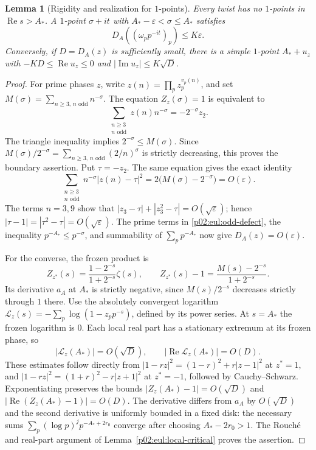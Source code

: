 \documentclass[11pt,letterpaper]{article}
\newtheorem{lemma}[theorem]{Lemma}
\theoremstyle{definition}
\theoremstyle{remark}
\newcommand{\eps}{\varepsilon}
\renewcommand{\Re}{\operatorname{Re}}
\renewcommand{\Im}{\operatorname{Im}}
\newcommand{\1}{\mathbf 1}
\begin{document}
\begin{lemma}[Rigidity and realization for $1$-points]
\label{p02:eul:one-rigidity}
Every twist has no $1$-points in $\Re s>A_*$. A $1$-point
$\sigma+it$ with $A_*-\eps<\sigma\le A_*$ satisfies
\[
 D_A((\omega_pp^{-it})_p)\le K\eps.
\]
Conversely, if $D=D_A(z)$ is sufficiently small, there is a simple
$1$-point $A_*+u_z$ with
$-KD\le\Re u_z\le0$ and $|\Im u_z|\le K\sqrt D$.
\end{lemma}
\begin{proof}
For prime phases $z$, write $z(n)=\prod_pz_p^{v_p(n)}$, and set
$M(\sigma)=\sum_{n\ge3,\,n\text{ odd}}n^{-\sigma}$.
The equation $Z_z(\sigma)=1$ is equivalent to
\[
 \sum_{\substack{n\ge3\\n\text{ odd}}}z(n)n^{-\sigma}
             =-2^{-\sigma}z_2.
\]
The triangle inequality implies $2^{-\sigma}\le M(\sigma)$.
Since $M(\sigma)/2^{-\sigma}=\sum_{n\ge3,\,n\text{ odd}}(2/n)^\sigma$
is strictly decreasing, this proves the boundary assertion.
Put $\tau=-z_2$. The same equation gives the exact identity
\begin{equation}\label{p02:eul:odd-defect}
 \sum_{\substack{n\ge3\\n\text{ odd}}}
 n^{-\sigma}|z(n)-\tau|^2
       =2\bigl(M(\sigma)-2^{-\sigma}\bigr)=O(\eps).
\end{equation}
The terms $n=3,9$ show that
$|z_3-\tau|+|z_3^2-\tau|=O(\sqrt\eps)$; hence
$|\tau-1|=|\tau^2-\tau|=O(\sqrt\eps)$.
The prime terms in \eqref{p02:eul:odd-defect}, the inequality
$p^{-A_*}\le p^{-\sigma}$, and summability of $\sum_pp^{-A_*}$
now give $D_A(z)=O(\eps)$.

For the converse, the frozen product is
\[
 Z_{z^*}(s)=\frac{1-2^{-s}}{1+2^{-s}}\zeta(s),\qquad
 Z_{z^*}(s)-1=\frac{M(s)-2^{-s}}{1+2^{-s}}.
\]
Its derivative $a_A$ at $A_*$ is strictly negative, since
$M(s)/2^{-s}$ decreases strictly through $1$ there. Use the absolutely
convergent logarithm
$\mathcal L_z(s)=-\sum_p\log(1-z_pp^{-s})$, defined by its power
series. At $s=A_*$ the frozen logarithm is $0$. Each local real part
has a stationary extremum at its frozen phase, so
\[
 |\mathcal L_z(A_*)|=O(\sqrt D),\qquad
 |\Re\mathcal L_z(A_*)|=O(D).
\]
These estimates follow directly from
$|1-rz|^2=(1-r)^2+r|z-1|^2$ at $z^*=1$, and
$|1-rz|^2=(1+r)^2-r|z+1|^2$ at $z^*=-1$,
followed by Cauchy--Schwarz. Exponentiating preserves the bounds
$|Z_z(A_*)-1|=O(\sqrt D)$ and
$|\Re(Z_z(A_*)-1)|=O(D)$.
The derivative differs from $a_A$ by $O(\sqrt D)$ and the second
derivative is uniformly bounded in a fixed disk: the necessary sums
$\sum_p(\log p)^jp^{-A_*+2r_0}$ converge after choosing
$A_*-2r_0>1$. The Rouch\'e and real-part argument of
Lemma~\ref{p02:eul:local-critical} proves the assertion.
\end{proof}
\end{document}
